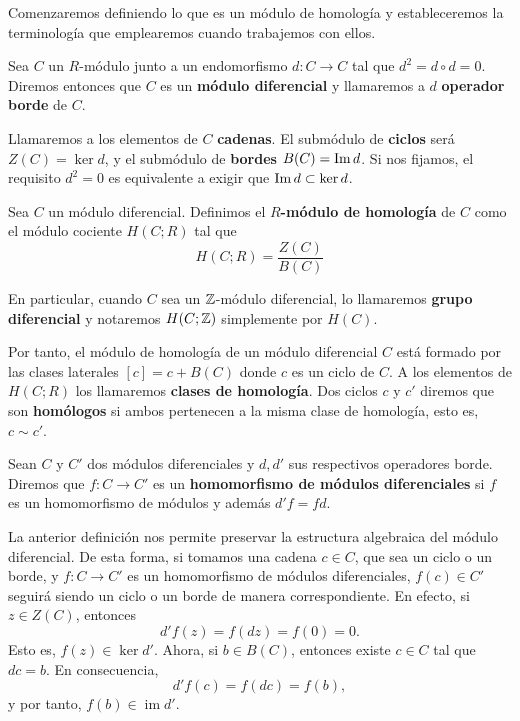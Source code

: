 Comenzaremos definiendo lo que es un módulo de homología y estableceremos la terminología
que emplearemos cuando trabajemos con ellos.

\begin{definicion}
	Sea \(C\) un \(R\)-módulo junto a un endomorfismo \(d: C \rightarrow C\) tal que \(d^{2}
	= d \circ d = 0\). Diremos entonces que \(C\) es un \textbf{módulo diferencial} y
	llamaremos a \(d\) \textbf{operador borde} de \(C\).
\end{definicion}

Llamaremos a los elementos de \(C\) \textbf{cadenas}. El submódulo de \textbf{ciclos}
será \(Z(C) = \ker d\), y el submódulo de \textbf{bordes} \(B(C) = \operatorname{Im} d\). Si nos
fijamos, el requisito \(d^{2}= 0\) es equivalente a exigir que \(\operatorname{Im}{d}\subset \ker{d}\).

\begin{definicion}
	Sea \(C\) un módulo diferencial. Definimos el \textbf{\(R\)-módulo de homología} de
	\(C\) como el módulo cociente \(H(C;R)\) tal que
	\[
	H(C;R) = \frac{Z(C)}{B(C)}
	\]
\end{definicion}

En particular, cuando \(C\) sea un \(\mathbb{Z}\)-módulo diferencial, lo llamaremos \textbf{grupo
	diferencial} y notaremos \(H(C;\mathbb{Z})\) simplemente por \(H(C)\).

Por tanto, el módulo de homología de un módulo diferencial \(C\) está formado por
las clases laterales \([c] = c + B(C)\) donde \(c\) es un ciclo de \(C\). A los elementos
de \(H(C;R)\) los llamaremos \textbf{clases de homología}. Dos ciclos \(c\) y \(c'\) diremos
que son \textbf{homólogos} si ambos pertenecen a la misma clase de homología, esto
es, \(c \sim c'\).

\begin{definicion}
	Sean \(C\) y \(C'\) dos módulos diferenciales y \(d, d'\) sus respectivos operadores
	borde. Diremos que \(f: C \rightarrow C'\) es un \textbf{homomorfismo de módulos
		diferenciales} si \(f\) es un homomorfismo de módulos y además \(d'f = fd\).
\end{definicion}

La anterior definición nos permite preservar la estructura algebraica del módulo
diferencial. De esta forma, si tomamos una cadena \(c \in C\), que sea un ciclo o
un borde, y \(f\colon C \to C'\) es un homomorfismo de módulos diferenciales,
\(f(c) \in C'\) seguirá siendo un ciclo o un borde de manera correspondiente. En efecto,
si \(z \in Z(C)\), entonces
\[
d'f(z) = f(dz) = f(0) = 0.
\]
Esto es, \(f(z) \in \ker d'\). Ahora, si \(b \in B(C)\), entonces existe \(c \in C\) tal
que \(dc = b\). En consecuencia,
\[
d'f(c) = f(dc) = f(b),
\]
y por tanto, \(f(b) \in \operatorname{im}d'\).

